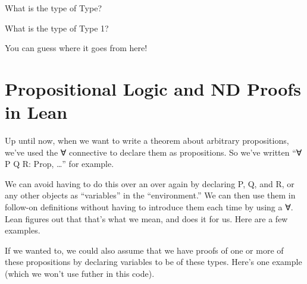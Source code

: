 \documentclass[letterpaper,10pt,english]{sphinxmanual}
\begin{document}
\begin{sphinxVerbatim}[commandchars=\\\{\}]
 
\end{sphinxVerbatim}

What is the type of Type?

\begin{sphinxVerbatim}[commandchars=\\\{\}]
 
\end{sphinxVerbatim}

What is the type of Type 1?

\begin{sphinxVerbatim}[commandchars=\\\{\}]
  
\end{sphinxVerbatim}

You can guess where it goes from here!


\section{Propositional Logic and ND Proofs in Lean}
\label{\detokenize{15-proofs:propositional-logic-and-nd-proofs-in-lean}}
Up until now, when we want to write a theorem about arbitrary
propositions, we’ve used the ∀ connective to declare them as
propositions. So we’ve written “∀ P Q R: Prop, …” for example.

We can avoid having to do this over an over again by declaring P, Q,
and R, or any other objects as “variables” in the “environment.”  We
can then use them in follow-on definitions without having to introduce
them each time by using a ∀. Lean figures out that that’s what we
mean, and does it for us. Here are a few examples.

\begin{sphinxVerbatim}[commandchars=\\\{\}]
    
\end{sphinxVerbatim}

If we wanted to, we could also assume that we have proofs of one or
more of these propositions by declaring variables to be of these
types.  Here’s one example (which we won’t use futher in this code).

\begin{sphinxVerbatim}[commandchars=\\\{\}]
  
\end{sphinxVerbatim}
\end{document}
